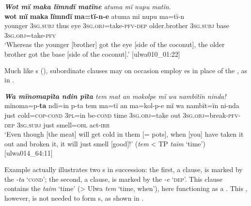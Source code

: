 \ea%
    \label{ex:complex:51}
        \textit{\textbf{Wot mï maka lïmndï matïne} atuma mï nupu matïn.}\\
\gll    \textbf{wot}    \textbf{mï}      \textbf{maka}  \textbf{lïmndï}  \textbf{ma=tï-n-e}     atuma      mï      nupu  ma=tï-n\\
    younger  3\textsc{sg.subj}  thus  eye    3\textsc{sg.obj}=take-\textsc{pfv-dep}  older.brother  \textsc{3sg.subj}  base  3\textsc{sg.obj}=take-\textsc{pfv}\\
\glt `Whereas the younger [brother] got the eye [side of the coconut], the older brother got the base [side of the coconut].’ [ulwa010\_01:22]
\z

Much like s (),  subordinate clauses may on occasion employ  es in place of the , as in .

\ea%
    \label{ex:complex:52}
          \textit{\textbf{Wa mïnomapïta ndin pïta} tem mat an mokolpe mï wa nambïtïn ninda!}\\
  {mïnoma=p-\textbf{ta}}    {ndï=in}  {p-ta}    {tem}  {ma=tï}      {an} {ma=kol-p-e}        mï      wa  nambït=ïn  ni-nda\\
    just  cold=\textsc{cop}{}-\textsc{cond}  \textsc{3pl}=in  be\textsc{{}-cond} time  3\textsc{sg.obj}=take  out    3\textsc{sg.obj}=break-\textsc{pfv-dep}  \textsc{3sg.subj}  just  smell=\textsc{obl}  act-\textsc{irr}\\
\glt `Even though [the meat] will get cold in them [= pots], when [you] have taken it out and broken it, it will just smell [good]!’ (\textit{tem} < TP \textit{taim} ‘time’) [ulwa014\_64:11]
\z

Example  actually illustrates two s in succession: the first, a  clause, is marked by the   \textit{-ta} ‘\textsc{cond}’; the second, a  clause, is marked by the  \textit{-e} ‘\textsc{dep}’. This  clause contains the   \textit{taim} ‘time’ (> Ulwa \textit{tem} ‘time, when’), here functioning as a . This , however, is not needed to form s, as shown in .


